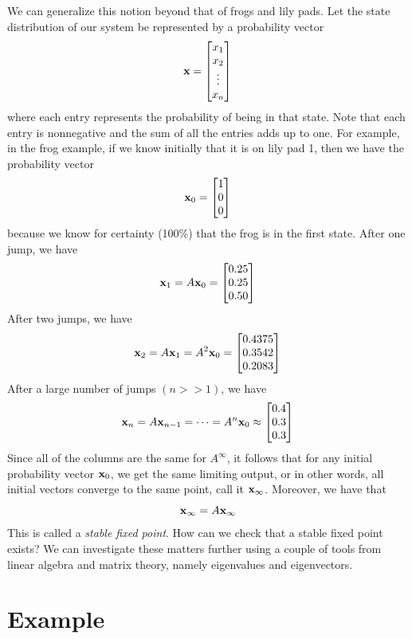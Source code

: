 We can generalize this notion beyond that of frogs and lily pads.
Let the state distribution of our system be represented by a probability vector
\[
{\bf x} = \begin{bmatrix}
x_1\\
x_2\\
\vdots\\
x_n
\end{bmatrix}
\]
where each entry represents the probability of being in that state.
Note that each entry is nonnegative and the sum of all the entries adds up to one.
For example, in the frog example, if we know initially that it is on lily pad 1, then we have the probability vector
\[
{\bf x}_0 = \begin{bmatrix}
1\\
0\\
0
\end{bmatrix}
\]
because we know for certainty (100\%) that the frog is in the first state.
After one jump, we have
\[
{\bf x}_1 = A {\bf x}_0 = \begin{bmatrix}
0.25\\
0.25\\
0.50
\end{bmatrix}
\]
After two jumps, we have
\[
{\bf x}_2 = A {\bf x}_1 = A^2 {\bf x}_0 = \begin{bmatrix}
0.4375\\
0.3542\\
0.2083
\end{bmatrix}
\]
After a large number of jumps $(n>>1)$, we have
\[
{\bf x}_n = A {\bf x}_{n-1} = \dots = A^n {\bf x}_0 \approx \begin{bmatrix}
0.4\\
0.3\\
0.3
\end{bmatrix}
\]
Since all of the columns are the same for $A^\infty$, it follows that for any initial probability vector ${\bf x}_0$, we get the same limiting output, or in other words, all initial vectors converge to the same point, call it ${\bf x}_\infty$.
Moreover, we have that
\[
{\bf x}_\infty = A {\bf x}_\infty
\]
This is called a \emph{stable fixed point}.
How can we check that a stable fixed point exists?
We can investigate these matters further using a couple of tools from 
linear algebra and matrix theory, namely eigenvalues and eigenvectors.

\section*{Example}

